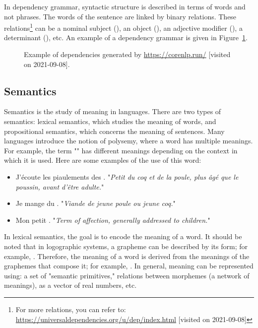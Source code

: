 \documentclass{KBook}
\begin{document}
In dependency grammar, syntactic structure is described in terms of words and not phrases. The words of the sentence are linked by binary relations. These relations\footnote{For more relations, you can refer to: \url{https://universaldependencies.org/u/dep/index.html} [visited on 2021-09-08]} can be a nominal subject (), an object (), an adjective modifier (), a determinant (), etc. An example of a dependency grammar is given in Figure~\ref{fig:exp-gram-dep}.

\begin{figure}[ht]
	\centering
	\caption[Example of dependencies.]{Example of dependencies generated by \url{https://corenlp.run/} [visited on 2021-09-08].}
	\label{fig:exp-gram-dep}
\end{figure}


\subsection{Semantics}

Semantics is the study of meaning in languages. There are two types of semantics: lexical semantics, which studies the meaning of words, and propositional semantics, which concerns the meaning of sentences. Many languages introduce the notion of polysemy, where a word has multiple meanings. For example, the term "" has different meanings depending on the context in which it is used. Here are some examples of the use of this word:

\begin{itemize}
	\item J'écoute les piaulements des . "\textit{Petit du coq et de la poule, plus âgé que le poussin, avant d'être adulte.}"
	\item Je mange du . "\textit{Viande de jeune poule ou jeune coq.}"
	\item Mon petit . "\textit{Term of affection, generally addressed to children.}"
\end{itemize}

In lexical semantics, the goal is to encode the meaning of a word. It should be noted that in logographic systems, a grapheme can be described by its form; for example, . Therefore, the meaning of a word is derived from the meanings of the graphemes that compose it; for example, . In general, meaning can be represented using: a set of "semantic primitives," relations between morphemes (a network of meanings), as a vector of real numbers, etc.
\end{document}
